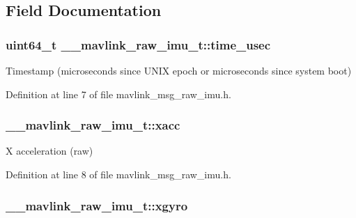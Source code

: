 \subsection{Field Documentation}
\hypertarget{struct____mavlink__raw__imu__t_a571520057ab2c9fa547fca7755099dfc}{
\subsubsection[{time\-\_\-usec}]{\setlength{\rightskip}{0pt plus 5cm}uint64\-\_\-t \-\_\-\-\_\-mavlink\-\_\-raw\-\_\-imu\-\_\-t\-::time\-\_\-usec}}\label{struct____mavlink__raw__imu__t_a571520057ab2c9fa547fca7755099dfc}


Timestamp (microseconds since U\-N\-I\-X epoch or microseconds since system boot) 



Definition at line 7 of file mavlink\-\_\-msg\-\_\-raw\-\_\-imu.\-h.

\hypertarget{struct____mavlink__raw__imu__t_ade9a866890ed99f81ce8bd7dbef2c920}{
\subsubsection[{xacc}]{ \-\_\-\-\_\-mavlink\-\_\-raw\-\_\-imu\-\_\-t\-::xacc}}\label{struct____mavlink__raw__imu__t_ade9a866890ed99f81ce8bd7dbef2c920}


X acceleration (raw) 



Definition at line 8 of file mavlink\-\_\-msg\-\_\-raw\-\_\-imu.\-h.

\hypertarget{struct____mavlink__raw__imu__t_ad1b8a0589cf0a476cb04629dcb60bbe9}{
\subsubsection[{xgyro}]{ \-\_\-\-\_\-mavlink\-\_\-raw\-\_\-imu\-\_\-t\-::xgyro}}\label{struct____mavlink__raw__imu__t_ad1b8a0589cf0a476cb04629dcb60bbe9}



